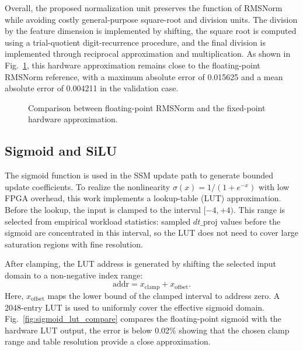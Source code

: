 \documentclass[11pt,twoside]{eitExjobb}
\begin{document}
Overall, the proposed normalization unit preserves the function of RMSNorm while
avoiding costly general-purpose square-root and division units. The division by the
feature dimension is implemented by shifting, the square root is computed using a
trial-quotient digit-recurrence procedure, and the final division is implemented through
reciprocal approximation and multiplication. As shown in
Fig.~\ref{fig:rmsnorm_float_vs_hw}, this hardware approximation remains close to the
floating-point RMSNorm reference, with a maximum absolute error of 0.015625 and a mean
absolute error of 0.004211 in the validation case.

\begin{figure}[H]
  \centering
  
  \caption{Comparison between floating-point RMSNorm and the fixed-point hardware approximation.}
  \label{fig:rmsnorm_float_vs_hw}
\end{figure}

\subsection{Sigmoid and SiLU}
\label{subsec:sigmoid_silu}

The sigmoid function is used in the SSM update path to generate bounded update
coefficients. To realize the nonlinearity
\(\sigma(x)=1/(1+e^{-x})\) with low FPGA overhead, this work implements a
lookup-table (LUT) approximation. Before the lookup, the input is clamped to the
interval \([-4,+4)\). This range is selected from empirical workload statistics:
sampled \(dt\_\mathrm{proj}\) values before the sigmoid are concentrated in this
interval, so the LUT does not need to cover large saturation regions with fine
resolution.

After clamping, the LUT address is generated by shifting the selected input domain to a
non-negative index range:
\begin{equation}
\mathrm{addr} = x_{\mathrm{clamp}} + x_{\mathrm{offset}} .
\label{eq:sigmoid_lut_addr}
\end{equation}
Here, \(x_{\mathrm{offset}}\) maps the lower bound of the clamped interval to address
zero. A 2048-entry LUT is used to uniformly cover the effective sigmoid domain.
Fig.~\ref{fig:sigmoid_lut_compare} compares the floating-point sigmoid with the
hardware LUT output, the error is below 0.02\% showing that the chosen clamp range 
and table resolution provide a
close approximation.
\end{document}
